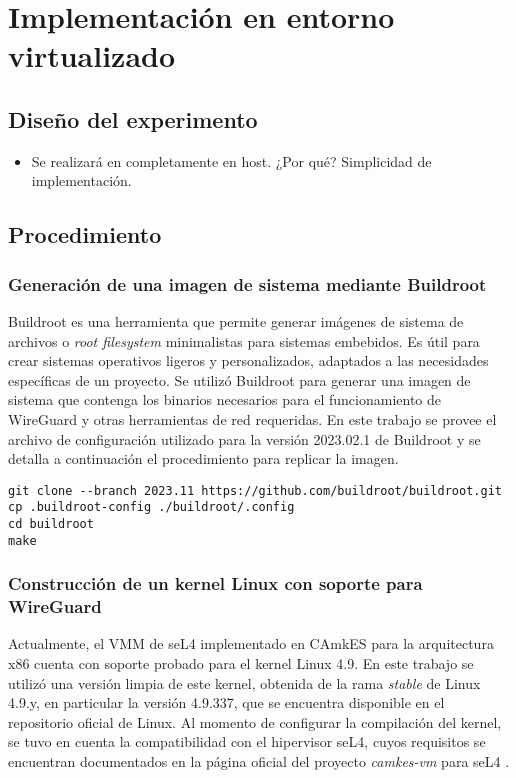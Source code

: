 \chapter{Implementación en entorno virtualizado} %
\section{Diseño del experimento}
\begin{itemize}
    \item Se realizará en completamente en host. ¿Por qué? Simplicidad de implementación.
\end{itemize}
\section{Procedimiento} %

\subsection{Generación de una imagen de sistema mediante Buildroot}
Buildroot es una herramienta que permite generar imágenes de sistema de archivos o \textit{root filesystem} minimalistas para sistemas embebidos. Es útil para crear sistemas operativos ligeros y personalizados, adaptados a las necesidades específicas de un proyecto. Se utilizó Buildroot para generar una imagen de sistema que contenga los binarios necesarios para el funcionamiento de WireGuard y otras herramientas de red requeridas.
En este trabajo se provee el archivo de configuración utilizado para la versión 2023.02.1 de Buildroot y se detalla a continuación el procedimiento para replicar la imagen.

\begin{lstlisting}[caption={Generación de imagen de sistema con Buildroot.}, label={lst:buildroot_procedure}]
git clone --branch 2023.11 https://github.com/buildroot/buildroot.git
cp .buildroot-config ./buildroot/.config
cd buildroot
make
\end{lstlisting}

\subsection{Construcción de un kernel Linux con soporte para WireGuard}
Actualmente, el VMM de seL4 implementado en CAmkES para la arquitectura x86 cuenta con soporte probado para el kernel Linux 4.9. En este trabajo se utilizó una versión limpia de este kernel, obtenida de la rama \textit{stable} de Linux 4.9.y, en particular la versión 4.9.337, que se encuentra disponible en el repositorio oficial de Linux. Al momento de configurar la compilación del kernel, se tuvo en cuenta la compatibilidad con el hipervisor seL4, cuyos requisitos se encuentran documentados en la página oficial del proyecto \textit{camkes-vm} para seL4 \cite{camkes_vm}.

